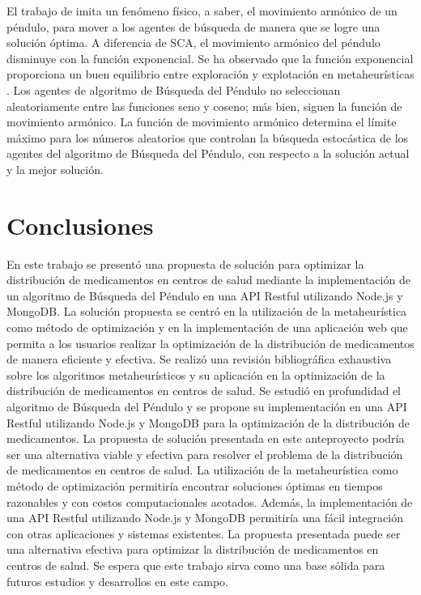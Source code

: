\documentclass[conference]{IEEEtran}
\begin{document}
El trabajo de \cite{aziz2022} imita un fenómeno físico, a saber, el movimiento
armónico
de un péndulo, para mover a los agentes de búsqueda de manera que se logre una
solución óptima. A diferencia de SCA, el movimiento armónico del péndulo
disminuye con la función exponencial. Se ha observado que la función
exponencial proporciona un buen equilibrio entre exploración y explotación en
metaheurísticas \cite{aziz2018singlesolution, rahman2018singleagent}. Los
agentes de algoritmo de Búsqueda del Péndulo no seleccionan aleatoriamente
entre
las funciones seno y coseno; más bien, siguen la función de movimiento
armónico. La función de movimiento armónico determina el límite máximo para los
números aleatorios que controlan la búsqueda estocástica de los agentes del
algoritmo de Búsqueda del Péndulo,
con respecto a la solución actual y la mejor solución.

\section{Conclusiones}
\label{sec:Conclusiones}
En este trabajo se presentó una propuesta de solución para optimizar la
distribución de medicamentos en centros de salud mediante la implementación de
un algoritmo de Búsqueda del Péndulo en una API Restful utilizando
Node.js y MongoDB. La solución propuesta se centró en la utilización de la
metaheurística como método de optimización y en la implementación de una
aplicación web que permita a los usuarios realizar la optimización de la
distribución de medicamentos de manera eficiente y efectiva.
Se realizó una revisión bibliográfica exhaustiva sobre los algoritmos
metaheurísticos y su aplicación en la optimización de la distribución de
medicamentos en centros de salud. Se estudió en profundidad el algoritmo de
Búsqueda del Péndulo y se propone su implementación en una API Restful
utilizando Node.js y MongoDB para la optimización de la distribución de
medicamentos.
La propuesta de solución presentada en este anteproyecto podría ser una
alternativa viable y efectiva para resolver el problema de la distribución de
medicamentos en centros de salud. La utilización de la metaheurística como
método de optimización permitiría encontrar soluciones óptimas en tiempos
razonables y con costos computacionales acotados. Además, la implementación de
una API Restful utilizando Node.js y MongoDB permitiría una fácil integración
con otras aplicaciones y sistemas existentes.
La propuesta presentada puede ser una alternativa efectiva para optimizar la
distribución de medicamentos en centros de salud. Se espera que este trabajo
sirva como una base sólida para futuros estudios y desarrollos en este campo.

\renewcommand\refname{Referencias}


\end{document}
